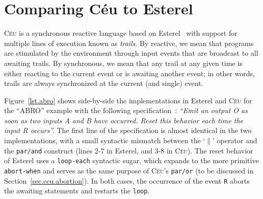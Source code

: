 \documentclass{acm_proc_article-sp}
\newcommand{\CEU}{\textsc{C\'{e}u}\xspace}
\newcommand{\code}[1] {{\small{\texttt{#1}}}}
\newcommand{\1}{\;}
\newcommand{\2}{\;\;}
\newcommand{\3}{\;\;\;}
\newcommand{\5}{\;\;\;\;\;}
\begin{document}
\begin{comment}
In this work, we present \CEU, a reactive language targeting embedded systems 
that unifies both imperative and dataflow synchronous programming styles.
\CEU is based on a small set of reactive control primitives similar in 
functionality to Esterel's \cite{esterel.design}.
On top of this kernel, \CEU provides disciplined side effects, which together 
with internal events enable dataflow capabilities to the language.

Although, the first two items are similar, they are orthogonal.
One is at compile time, the other runtime.
Even without the first, the second is still valid.
The first warns about suspicious programs that still execute deterministically.

In our discussion, shared memory concerns not only variables, but also 
low-level accesses that ultimately use shared resources in the underlying 
platform (e.g., memory-mapped ports for I/O).

The stacked execution for internal events introduces support for a restricted 
form of subroutines that cannot express recursive definitions (either directly 
or indirectly), resulting in memory-bounded programs that preclude stack 
overflows.
\end{comment}

\section{Comparing C\'eu to Esterel}
\label{sec.ceu}

\CEU is a synchronous reactive language based on Esterel~\cite{esterel.ieee91} 
with support for multiple lines of execution known as \emph{trails}.
By reactive, we mean that programs are stimulated by the environment through 
input events that are broadcast to all awaiting trails.
By synchronous, we mean that any trail at any given time is either reacting to 
the current event or is awaiting another event;
in other words, trails are always synchronized at the current (and single) 
event.

Figure~\ref{lst.abro} shows side-by-side the implementations in Esterel and 
\CEU for the ``ABRO'' example with the following 
specification~\cite{esterel.primer}:
%
\emph{``Emit an output O as soon as two inputs A and B have occurred.
Reset this behavior each time the input R occurs''.}
%
The first line of the specification is almost identical in the two 
implementations, with a small syntactic mismatch between the `$\|$' operator 
and the \code{par/and} construct (lines 2-7 in Esterel, and 3-8 in \CEU).
%
The reset behavior of Esterel uses a \code{loop-each} syntactic sugar, which 
expands to the more primitive \code{abort-when} and serves as the same purpose 
of \CEU's \code{par/or} (to be discussed in Section~\ref{sec.ceu.abortion}).
In both cases, the occurrence of the event \code{R} aborts the awaiting 
statements and restarts the \code{loop}.
\end{document}
